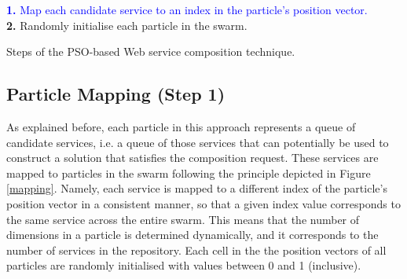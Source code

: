 \documentclass{llncs}
\begin{document}
\begin{algorithm}[h]
 \setlength{}
 \let\oldnl\nl%
\newcommand{\nonl}{\renewcommand{\nl}{\let\nl\oldnl}}
 \LinesNumbered
 	\textcolor{blue}{\textbf{1.} Map each candidate service to an index in the particle's position vector.}\\
	\textbf{2.} Randomly initialise each particle in the swarm.\\
	\nonl {}
	
 \caption{Steps of the PSO-based Web service composition technique.}
\label{novelSteps}
\end{algorithm}

\subsection{Particle Mapping (Step 1)}

As explained before, each particle in this approach represents a queue of candidate services, i.e. a queue of those services that can potentially be used to construct a solution that satisfies the composition request. These services are mapped to particles in the swarm following the principle depicted in Figure \ref{mapping}. Namely, each service is mapped to a different index of the particle's position vector in a consistent manner, so that a given index value corresponds to the same service across the entire swarm. This means that the number of dimensions in a particle is determined dynamically, and it corresponds to the number of services in the repository. Each cell in the the position vectors of all particles are randomly initialised with values between 0 and 1 (inclusive).
\end{document}
